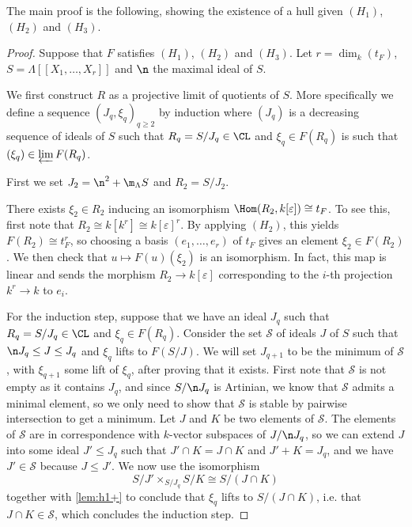 The main proof is the following, showing the existence of a hull given
$(H_1)$, $(H_2)$ and $(H_3)$.
\begin{proof}
\leanok
{}

Suppose that $F$ satisfies $(H_1)$, $(H_2)$ and $(H_3)$.
Let $r = \dim_k(t_F)$, $S = \Lambda[[X_1, \ldots, X_r]]$ and $\n$
the maximal ideal of $S$.

We first construct $R$ as a projective limit
of quotients of $S$. More specifically we define a sequence
$(J_q, \xi_q)_{q\ge2}$ by induction where $(J_q)$ is a decreasing
sequence of ideals of $S$ such that $R_q = S / J_q \in \CL$ and
$\xi_q \in F(R_q)$ is such that $(\xi_q) \in \varprojlim F(R_q)$.

First we set $J_2 = \n^2 + \m_\Lambda S$ and $R_2 = S/J_2$.

There exists $\xi_2 \in R_2$ inducing an isomorphism
$\Hom (R_2, k[\varepsilon]) \cong t_F$.
To see this, first note that $R_2 \cong k[k^r] \cong k[\varepsilon]^r$.
By applying $(H_2)$, this yields $F(R_2) \cong t_F^r$,
so choosing a basis $(e_1, \ldots, e_r)$
of $t_F$ gives
an element $\xi_2 \in F(R_2)$. We then check that $u \mapsto F(u)(\xi_2)$
is an isomorphism. In fact, this map is linear and sends the morphism
$R_2 \to k[\varepsilon]$ corresponding to the $i$-th projection
$k^r \to k$
to $e_i$.

For the induction step, suppose that we have an ideal $J_q$ such
that $R_q = S/J_q \in \CL$ and $\xi_q \in F(R_q)$.
Consider the set $\mathscr{S}$ of ideals $J$ of $S$ such that
$\n J_q \le J \le J_q$ and $\xi_q$ lifts to $F(S/J)$.
We will set $J_{q+1}$ to be the minimum of $\mathscr{S}$,
with $\xi_{q+1}$ some lift of $\xi_q$,
after proving that it exists.
First note that $\mathscr{S}$ is not empty as it contains $J_q$,
and since $S / \n J_q$ is Artinian, we know that
$\mathscr{S}$ admits a minimal element, so we only need
to show that $\mathscr{S}$ is stable by pairwise intersection
to get a minimum.
Let $J$ and $K$ be two elements of $\mathscr{S}$.
The elements of $\mathscr{S}$ are in correspondence with
$k$-vector subspaces of $J/\n J_q$,
so we can extend
$J$ into some ideal $J' \le J_q$ such that
$J' \cap K = J \cap K$ and $J' + K = J_q$, and we have
$J' \in \mathscr{S}$ because $J \le J'$.
We now use the isomorphism
$$S/J' \times_{S/J_q} S/K \cong S/(J \cap K)$$
together with \cref{lem:h1+} to conclude that $\xi_q$ lifts to
$S/(J \cap K)$, i.e. that $J \cap K \in \mathscr{S}$, which
concludes the induction step.



\end{proof}
